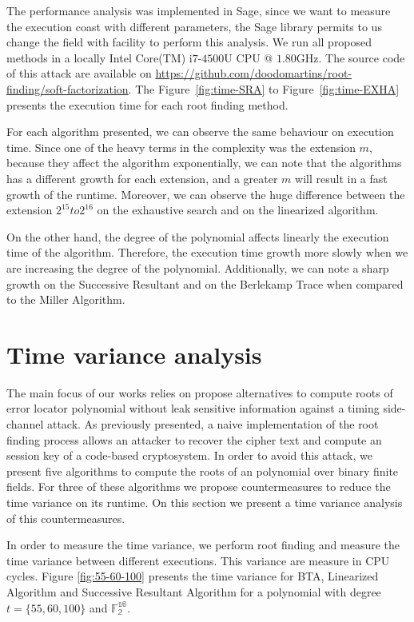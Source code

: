 The performance analysis was implemented in Sage\cite{sage}, since we want to measure the execution coast with different parameters, the Sage library permits to us change the field with facility to perform this analysis. We run all proposed methods in a locally Intel\textsuperscript{\tiny\textregistered} Core(TM) i$7$-$4500$U CPU @ $1.80$GHz. The source code of this attack are available on \url{https://github.com/doodomartins/root-finding/soft-factorization}. The Figure~\ref{fig:time-SRA} to Figure~\ref{fig:time-EXHA} presents the execution time for each root finding method.

For each algorithm presented, we can observe the same behaviour on execution time. Since one of the heavy terms in the complexity was the extension $m$, because they affect the algorithm exponentially, we can note that the algorithms has a different growth for each extension, and a greater $m$ will result in a fast growth of the runtime. Moreover, we can observe the huge difference between the extension $2^15 to 2^16$ on the exhaustive search and on the linearized algorithm. 

On the other hand, the degree of the polynomial affects linearly the execution time of the algorithm. Therefore, the execution time growth more slowly when we are increasing the degree of the polynomial. Additionally, we can note a sharp growth on the Successive Resultant and on the Berlekamp Trace when compared to the Miller Algorithm.

\section{Time variance analysis}
The main focus of our works relies on propose alternatives to compute roots of error locator polynomial without leak sensitive information against a timing side-channel attack. As previously presented, a naive implementation of the root finding process allows an attacker to recover the cipher text and compute an session key of a code-based cryptosystem. In order to avoid this attack, we present five algorithms to compute the roots of an polynomial over binary finite fields. For three of these algorithms we propose countermeasures to reduce the time variance on its runtime. On this section we present a time variance analysis of this countermeasures.

In order to measure the time variance, we perform root finding and measure the time variance between different executions. This variance are measure in CPU cycles. Figure \ref{fig:55-60-100} presents the time variance for BTA, Linearized Algorithm and Successive Resultant Algorithm for a polynomial with degree $t = \{55, 60, 100\}$ and $\mathbb{F_2^{16}}$.

